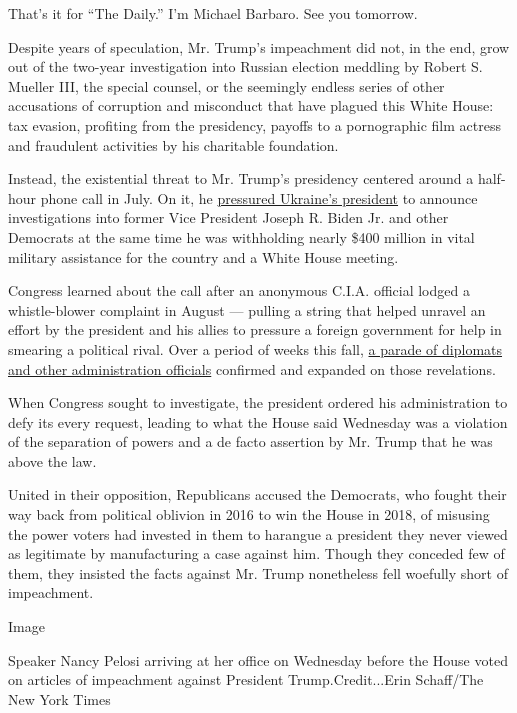 That's it for ``The Daily.'' I'm Michael Barbaro. See you tomorrow.

Despite years of speculation, Mr. Trump's impeachment did not, in the
end, grow out of the two-year investigation into Russian election
meddling by Robert S. Mueller III, the special counsel, or the seemingly
endless series of other accusations of corruption and misconduct that
have plagued this White House: tax evasion, profiting from the
presidency, payoffs to a pornographic film actress and fraudulent
activities by his charitable foundation.

Instead, the existential threat to Mr. Trump's presidency centered
around a half-hour phone call in July. On it, he
\href{https://www.nytimes.com/2019/10/08/us/politics/trump-ukraine-whistleblower.html}{pressured
Ukraine's president} to announce investigations into former Vice
President Joseph R. Biden Jr. and other Democrats at the same time he
was withholding nearly \$400 million in vital military assistance for
the country and a White House meeting.

Congress learned about the call after an anonymous C.I.A. official
lodged a whistle-blower complaint in August --- pulling a string that
helped unravel an effort by the president and his allies to pressure a
foreign government for help in smearing a political rival. Over a period
of weeks this fall,
\href{https://www.nytimes.com/2019/11/19/us/politics/trump-impeachment-hearing-testimony.html}{a
parade of diplomats and other administration officials} confirmed and
expanded on those revelations.

When Congress sought to investigate, the president ordered his
administration to defy its every request, leading to what the House said
Wednesday was a violation of the separation of powers and a de facto
assertion by Mr. Trump that he was above the law.

United in their opposition, Republicans accused the Democrats, who
fought their way back from political oblivion in 2016 to win the House
in 2018, of misusing the power voters had invested in them to harangue a
president they never viewed as legitimate by manufacturing a case
against him. Though they conceded few of them, they insisted the facts
against Mr. Trump nonetheless fell woefully short of impeachment.

Image

Speaker Nancy Pelosi arriving at her office on Wednesday before the
House voted on articles of impeachment against President
Trump.Credit...Erin Schaff/The New York Times

